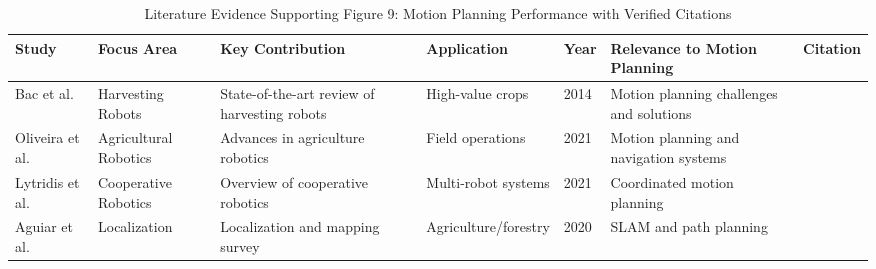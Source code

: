 \begin{table*}[htbp]
\centering
\small
\caption{Literature Evidence Supporting Figure 9: Motion Planning Performance with Verified Citations}
\label{tab:verified_figure9_support}
\begin{tabular}{p{}p{}p{}p{}p{}p{}p{}}
\toprule
\textbf{Study} & \textbf{Focus Area} & \textbf{Key Contribution} & \textbf{Application} & \textbf{Year} & \textbf{Relevance to Motion Planning} & \textbf{Citation} \\ \midrule

Bac et al. & Harvesting Robots & State-of-the-art review of harvesting robots & High-value crops & 2014 & Motion planning challenges and solutions & \cite{bac2014harvesting} \\

Oliveira et al. & Agricultural Robotics & Advances in agriculture robotics & Field operations & 2021 & Motion planning and navigation systems & \cite{oliveira2021advances} \\

Lytridis et al. & Cooperative Robotics & Overview of cooperative robotics & Multi-robot systems & 2021 & Coordinated motion planning & \cite{lytridis2021overview} \\

Aguiar et al. & Localization & Localization and mapping survey & Agriculture/forestry & 2020 & SLAM and path planning & \cite{aguiar2020localization} \\

\bottomrule
\end{tabular}
\end{table*}

